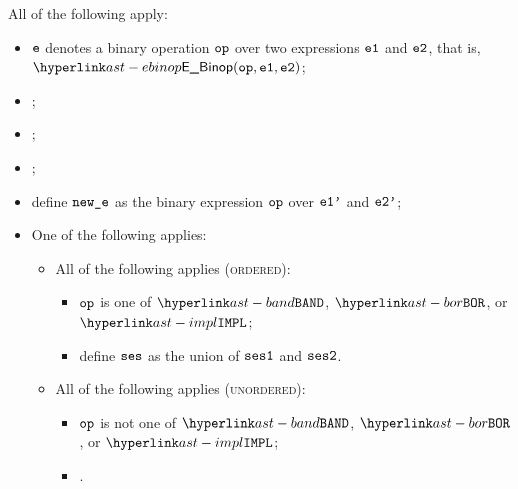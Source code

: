 \ProseParagraph
All of the following apply:
\begin{itemize}
  \item $\ve$ denotes a binary operation $\op$ over two expressions $\veone$ and $\vetwo$, that is, \\ $\EBinop(\op, \veone, \vetwo)$;
  \item \Proseannotateexpr{$\tenv$}{$\veone$}{\\ $(\vtone, \veonep, \vsesone)$\ProseOrTypeError};
  \item \Proseannotateexpr{$\tenv$}{$\vetwo$}{\\ $(\vttwo, \vetwop, \vsestwo)$\ProseOrTypeError};
  \item \Proseapplybinoptypes{$\tenv$}{\op}{\vtone}{\vttwo}{$\vt$\ProseOrTypeError};
  \item define $\newe$ as the binary expression $\op$ over $\veonep$ and $\vetwop$;
  \item One of the following applies:
  \begin{itemize}
    \item All of the following applies (\textsc{ordered}):
    \begin{itemize}
      \item $\op$ is one of $\BAND$, $\BOR$, or $\IMPL$;
      \item define $\vses$ as the union of $\vsesone$ and $\vsestwo$.
    \end{itemize}

    \item All of the following applies (\textsc{unordered}):
    \begin{itemize}
      \item $\op$ is not one of $\BAND$, $\BOR$, or $\IMPL$;
      \item {}.
    \end{itemize}
  \end{itemize}
\end{itemize}
\FormallyParagraph
\begin{mathpar}
\end{mathpar}

